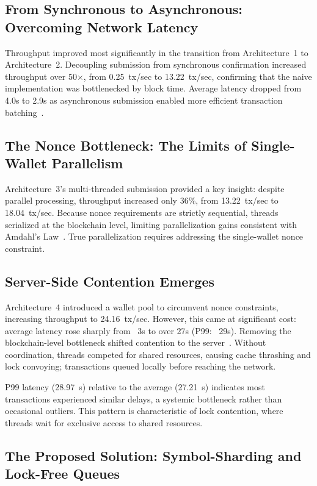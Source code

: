 \subsection{From Synchronous to Asynchronous: Overcoming Network Latency}

Throughput improved most significantly in the transition from Architecture~1 to Architecture~2. Decoupling submission from synchronous confirmation increased throughput over 50$\times$, from 0.25~tx/sec to 13.22~tx/sec, confirming that the naive implementation was bottlenecked by block time. Average latency dropped from 4.0s to 2.9s as asynchronous submission enabled more efficient transaction batching~\cite{ding2018batching,hennessy2017computer}.

\subsection{The Nonce Bottleneck: The Limits of Single-Wallet Parallelism}

Architecture~3's multi-threaded submission provided a key insight: despite parallel processing, throughput increased only 36\%, from 13.22~tx/sec to 18.04~tx/sec. Because nonce requirements are strictly sequential, threads serialized at the blockchain level, limiting parallelization gains consistent with Amdahl's Law~\cite{amdahl1967validity}. True parallelization requires addressing the single-wallet nonce constraint.

\subsection{Server-Side Contention Emerges}

Architecture~4 introduced a wallet pool to circumvent nonce constraints, increasing throughput to 24.16~tx/sec. However, this came at significant cost: average latency rose sharply from ~3s to over 27s (P99: ~29s). Removing the blockchain-level bottleneck shifted contention to the server~\cite{moir2018concurrent}. Without coordination, threads competed for shared resources, causing cache thrashing and lock convoying; transactions queued locally before reaching the network.

P99 latency (28.97~s) relative to the average (27.21~s) indicates most transactions experienced similar delays, a systemic bottleneck rather than occasional outliers. This pattern is characteristic of lock contention, where threads wait for exclusive access to shared resources.

\subsection{The Proposed Solution: Symbol-Sharding and Lock-Free Queues}

